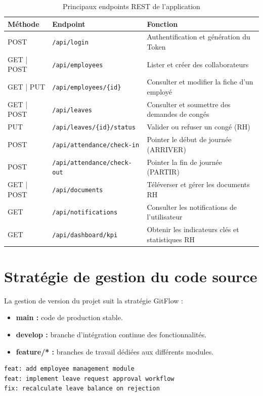 \documentclass[12pt,a4paper]{report}
\begin{document}
\begin{table}[H]
\centering
\caption{Principaux endpoints REST de l'application}
\label{tab:api_endpoints}
\begin{tabularx}{\textwidth}{l l X}
\toprule
\textbf{Méthode} & \textbf{Endpoint} & \textbf{Fonction} \\
\midrule
POST & \texttt{/api/login} & Authentification et génération du Token \\
GET | POST & \texttt{/api/employees} & Lister et créer des collaborateurs \\
GET | PUT & \texttt{/api/employees/\{id\}} & Consulter et modifier la fiche d'un employé \\
GET | POST & \texttt{/api/leaves} & Consulter et soumettre des demandes de congés \\
PUT & \texttt{/api/leaves/\{id\}/status} & Valider ou refuser un congé (RH) \\
POST & \texttt{/api/attendance/check-in} & Pointer le début de journée (ARRIVER) \\
POST & \texttt{/api/attendance/check-out} & Pointer la fin de journée (PARTIR) \\
GET | POST & \texttt{/api/documents} & Téléverser et gérer les documents RH \\
GET & \texttt{/api/notifications} & Consulter les notifications de l'utilisateur \\
GET & \texttt{/api/dashboard/kpi} & Obtenir les indicateurs clés et statistiques RH \\
\bottomrule
\end{tabularx}
\end{table}

\section{Stratégie de gestion du code source}
La gestion de version du projet suit la stratégie GitFlow :
\begin{itemize}
    \item \textbf{main :} code de production stable.
    \item \textbf{develop :} branche d'intégration continue des fonctionnalités.
    \item \textbf{feature/* :} branches de travail dédiées aux différents modules.
\end{itemize}

\begin{lstlisting}[language=bash, caption={Conventions de commits Git adoptées}, label={lst:git_commits}]
feat: add employee management module
feat: implement leave request approval workflow
fix: recalculate leave balance on rejection
\end{lstlisting}
\end{document}
